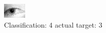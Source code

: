 \begin{figure}[h!]
\begin{center}
\includegraphics[width=0.60\columnwidth]{figures/ID1305_class_4_target_3.png}
\end{center}
\caption{ Classification: 4 actual target: 3}
\label{fig:ID1305_class_4_target_3}
\end{figure}

